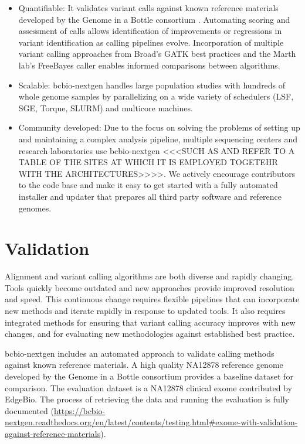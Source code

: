 \documentclass{frontiersSCNS}
\begin{document}
\begin{itemize}
\item Quantifiable: It validates variant calls against known reference materials
  developed by the Genome in a Bottle consortium \citep{zook_integrating_2013}.
  Automating scoring and assessment of calls allows identification of
  improvements or regressions in variant identification as calling pipelines
  evolve. Incorporation of multiple variant calling approaches from Broad's GATK
  best practices \citep{van_der_auwera_fastq_2002} and the Marth lab's FreeBayes
  caller \citep{garrison_haplotype-based_2012} enables informed comparisons
  between algorithms.

\item Scalable: bcbio-nextgen handles large population studies with
  hundreds of whole genome samples by parallelizing on a wide variety
  of schedulers (LSF, SGE, Torque, SLURM) and multicore machines.

\item Community developed: Due to the focus on solving the problems
  of setting up and maintaining a complex analysis pipeline, multiple
  sequencing centers and research laboratories use bcbio-nextgen <<<SUCH AS
  AND REFER TO A TABLE OF THE SITES AT WHICH IT IS EMPLOYED TOGETEHR WITH THE ARCHITECTURES>>>>. We
  actively encourage contributors to the code base and make it easy to
  get started with a fully automated installer and updater that
  prepares all third party software and reference genomes.
\end{itemize}

\section*{Validation}

Alignment and variant calling algorithms are both diverse and rapidly
changing. Tools quickly become outdated and new approaches provide improved
resolution and speed. This continuous change requires flexible pipelines that
can incorporate new methods and iterate rapidly in response to updated tools. It
also requires integrated methods for ensuring that variant calling accuracy
improves with new changes, and for evaluating new methodologies against
established best practice.

bcbio-nextgen includes an automated approach to validate calling methods against
known reference materials. A high quality NA12878 reference genome developed by
the Genome in a Bottle consortium \citep{zook_integrating_2013} provides a
baseline dataset for comparison. The evaluation dataset is a NA12878 clinical
exome contributed by EdgeBio. The process of retrieving the data and running the
evaluation is fully documented
(\url{https://bcbio-nextgen.readthedocs.org/en/latest/contents/testing.html#exome-with-validation-against-reference-materials}).
\end{document}
